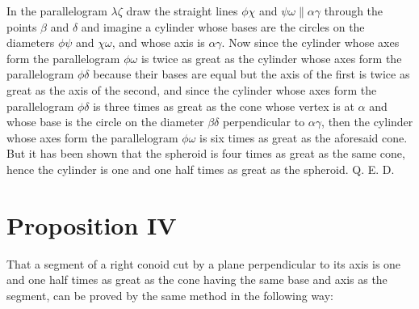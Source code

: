 \documentclass[12pt]{article}
\begin{document}
In the parallelogram $\lambda\zeta$ draw the straight lines $\phi\chi$
and $\psi\omega \| \alpha\gamma$ through the points $\beta$ and
$\delta$ and imagine a cylinder whose bases are the circles on the
diameters $\phi\psi$ and $\chi\omega$, and whose axis is
$\alpha\gamma$. Now since the cylinder whose axes form the
parallelogram $\phi\omega$ is twice as great as the cylinder whose
axes form the parallelogram $\phi\delta$ because their bases are equal
but the axis of the first is twice as great as the axis of the second,
and since the cylinder whose axes form the parallelogram $\phi\delta$
is three times as great as the cone whose vertex is at $\alpha$ and
whose base is the circle on the diameter $\beta\delta$ perpendicular
to $\alpha\gamma$, then the cylinder whose axes form the parallelogram
$\phi\omega$ is six times as great as the aforesaid cone. But it has
been shown that the spheroid is four times as great as the same cone,
hence the cylinder is one and one half times as great as the
spheroid. Q. E. D.


\section*{Proposition IV}

That a segment of a right conoid cut by a plane perpendicular to its
axis is one and one half times as great as the cone having the same
base and axis as the segment, can be proved by the same method in the
following way:
\end{document}
